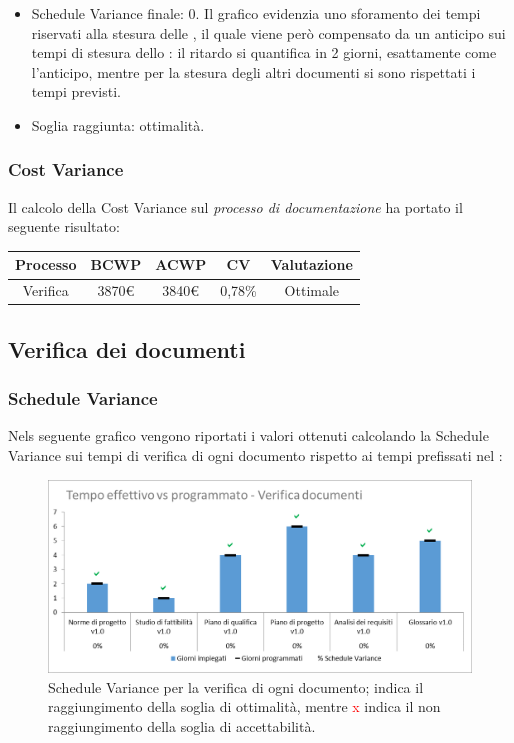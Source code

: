 \begin{itemize}
	\item Schedule Variance finale: 0. 
	Il grafico evidenzia uno sforamento dei tempi riservati alla stesura delle \NdP{}, il quale viene però compensato da un anticipo sui tempi di stesura dello \SdF{}: il ritardo si quantifica in 2 giorni, esattamente come l'anticipo, mentre per la stesura degli altri documenti si sono rispettati i tempi previsti. 
	
	\item Soglia raggiunta: ottimalità.
\end{itemize}

\subsubsection{Cost Variance}
Il calcolo della Cost Variance sul \emph{processo di documentazione} ha portato il seguente risultato: 

{
\renewcommand{\arraystretch}{2}
\centering
\begin{tabular}{| c | c | c | c | c |}
	\hline
	\textbf{Processo} & \textbf{BCWP} & \textbf{ACWP} & \textbf{CV} & \textbf{Valutazione} \\
	\hline
	Verifica & 3870\euro & 3840\euro & 0,78\% & Ottimale \\
	\hline
\end{tabular}

}


\subsection{Verifica dei documenti}
\subsubsection{Schedule Variance}
Nels seguente grafico vengono riportati i valori ottenuti calcolando la Schedule Variance sui tempi di verifica di ogni documento rispetto ai tempi prefissati nel \PdP{}:

\begin{figure}[h!]
	\centering
	\includegraphics[scale=0.75]{img/Grafici/SV-VerDocumenti.png}
	\caption{Schedule Variance per la verifica di ogni documento; \textcolor{green}{\checkmark} indica il raggiungimento della soglia di ottimalità, mentre \textcolor{red}{x} indica il non raggiungimento della soglia di accettabilità.}
	\label{fig:SV-VerDocumenti}
\end{figure}

